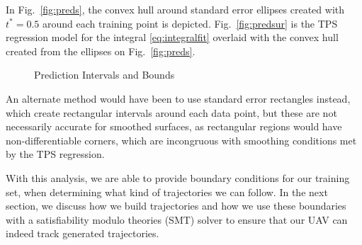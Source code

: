 \documentclass[letterpaper, 10 pt, conference]{ieeeconf}  %
\newcommand\NB[1]{$\spadesuit$\footnote{NB: #1}}
\begin{document}
In Fig.~\ref{fig:preds}, the convex hull around standard error ellipses created with $t^* = 0.5$ around each training point is depicted. Fig.~\ref{fig:predsur} is the TPS regression model for the integral \eqref{eq:integralfit} overlaid with the convex hull \cite{bounds} created from the ellipses on Fig.~\ref{fig:preds}.
\begin{figure}[H]
	\centering
	\caption{Prediction Intervals and Bounds}
	\label{fig:bounds}
\end{figure}
An alternate method would have been to use standard error rectangles\cite{stdellipse} instead, which create rectangular intervals around each data point, but these are not necessarily accurate for smoothed surfaces, as rectangular regions would have non-differentiable corners, which are incongruous with smoothing conditions met by the TPS regression. 

With this analysis, we are able to provide boundary conditions for our training set, when determining what kind of trajectories we can follow. In the next section, we discuss how we build trajectories and how we use these boundaries with a satisfiability modulo theories (SMT) solver \cite{smt} to ensure that our UAV can indeed track generated trajectories.
\end{document}
